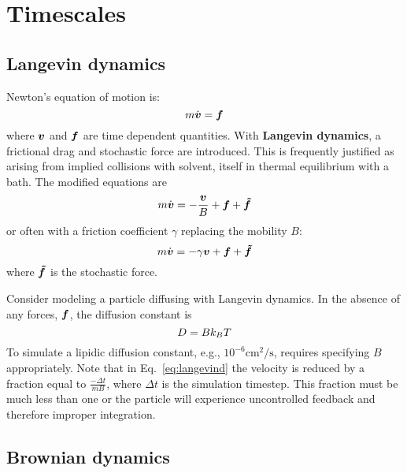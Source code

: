 
\section{ Timescales } \label{sec:timescales}

\subsection{Langevin dynamics}

Newton's equation of motion is:
\begin{equation}
m \dot{\boldsymbol{v}} = \boldsymbol{f}
\end{equation}
where $\boldsymbol{v}$ and $\boldsymbol{f}$ are time dependent quantities.
With {\bf Langevin dynamics}, a frictional drag and stochastic force are introduced.
This is frequently justified as arising from implied collisions with solvent, itself in thermal equilibrium with a bath.
The modified equations are
\begin{equation}
m \dot{\boldsymbol{v}} = -\frac{\boldsymbol{v}}{B} + \boldsymbol{f} + \boldsymbol{\tilde{f}}
\end{equation}
or often with a friction coefficient $\gamma$ replacing the mobility $B$:
\begin{equation}
\label{eq:langevind}
m \dot{\boldsymbol{v}} = -\gamma \boldsymbol{v} + \boldsymbol{f} + \boldsymbol{\tilde{f}}
\end{equation}
where $\boldsymbol{\tilde{f}}$ is the stochastic force.

Consider modeling a particle diffusing with Langevin dynamics.
In the absence of any forces, $\boldsymbol{f}$, the diffusion constant is
\begin{equation}
D = B k_B T
\end{equation}
To simulate a lipidic diffusion constant, e.g., $10^{-6} \textrm{cm}^2/\textrm{s}$, requires specifying $B$ appropriately.
Note that in Eq.~\ref{eq:langevind} the velocity is reduced by a fraction equal to $\frac{-\Delta t}{m B}$,
where $\Delta t$ is the simulation timestep.
This fraction must be much less than one or the particle will experience uncontrolled feedback and therefore improper integration.

\subsection{Brownian dynamics}

